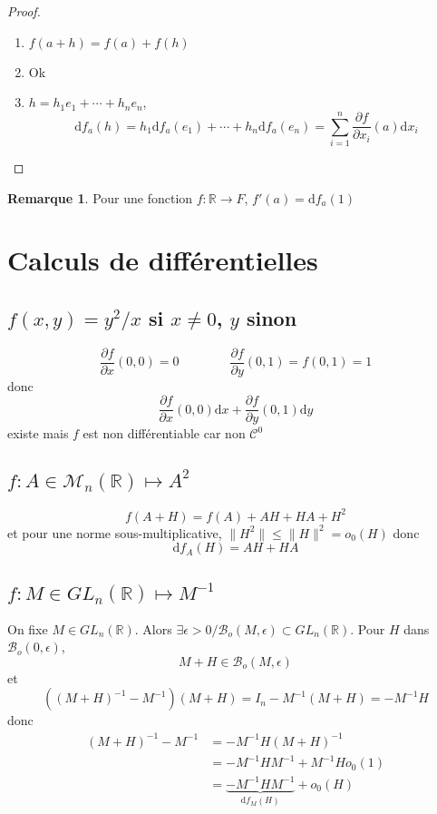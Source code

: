 \documentclass{article}
\theoremstyle{definition}
\newtheorem*{rem}{Remarque}
\begin{document}
\begin{proof} ~
\begin{enumerate}
    \item $f(a+h)=f(a)+f(h)$
    \item Ok
    \item $h=h_1e_1+\cdots +h_ne_n$, \[
        \mathrm df_a(h)=h_1\mathrm df_a(e_1)+\cdots +h_n\mathrm df_a(e_n)=\sum_{i=1}^n\frac{\partial f}{\partial x_i}(a)\mathrm dx_i
    \]
\end{enumerate}
\end{proof}

\begin{rem}
Pour une fonction $f:\mathbb R\longrightarrow F$, $f'(a)=\mathrm df_a(1)$
\end{rem}

\section{Calculs de différentielles}

\subsection{$f(x, y)=y^2/x$ si $x\neq 0$, $y$ sinon}

\[
\frac{\partial f}{\partial x}(0, 0)=0 \qquad\qquad \frac{\partial f}{\partial y}(0, 1)=f(0, 1)=1
\]
donc \[
\frac{\partial f}{\partial x}(0, 0) \mathrm dx+ \frac{\partial f}{\partial y}(0, 1)\mathrm dy
\]
existe mais $f$ est non différentiable car non $\mathcal C^0$

\subsection{$f:A\in\mathcal M_n(\mathbb R)\longmapsto A^2$}

\[
    f(A+H)=f(A)+AH+HA+H^2
\]
et pour une norme sous-multiplicative, $\|H^2\|\leq \|H\|^2=o_0(H)$ donc \[
    \mathrm df_A(H)=AH+HA
\]

\subsection{$f:M\in GL_n(\mathbb R)\longmapsto M^{-1}$}

On fixe $M\in GL_n(\mathbb R)$. Alors $\exists \epsilon >0 / \mathcal B_o(M, \epsilon)\subset GL_n(\mathbb R)$. Pour $H$ dans $\mathcal B_o(0, \epsilon)$, \[
    M+H\in\mathcal B_o(M, \epsilon)
\]
et \[
    \left((M+H)^{-1}-M^{-1}\right)(M+H)=I_n-M^{-1}(M+H)=-M^{-1}H
    \] donc
    \begin{align*}
    (M+H)^{-1}-M^{-1}&=-M^{-1}H(M+H)^{-1}\\&=-M^{-1}HM^{-1}+M^{-1}Ho_0(1)\\&=\underbrace{-M^{-1}HM^{-1}}_{\mathrm df_M(H)}+o_0(H)
\end{align*}
\end{document}
